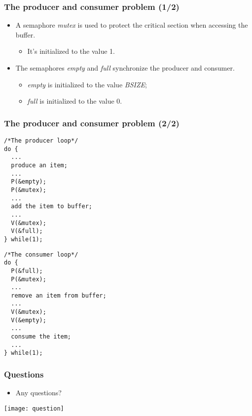\documentclass[CJKutf8,dvipsnames,table]{beamer}
\begin{document}
\begin{CJK*}{UTF8}{song}
  \begin{frame}
  \frametitle{The producer and consumer problem (1/2)} \pause
  \begin{itemize}
  \item{A semaphore \emph{mutex} is used to protect the critical section when accessing the buffer.} \pause
    \begin{itemize}
    \item{It's initialized to the value 1.} \pause
    \end{itemize}
  \item{The semaphores \emph{empty} and \emph{full} synchronize the producer
    and consumer.} \pause
    \begin{itemize}
    \item{\emph{empty} is initialized to the value \emph{BSIZE};} \pause
    \item{\emph{full} is initialized to the value 0.}
    \end{itemize}
  \end{itemize}
  \end{frame}

  \begin{frame}[fragile]
  \frametitle{The producer and consumer problem (2/2)} \pause
  \begin{minipage}[c]{0.5\textwidth}

\begin{lstlisting}
/*The producer loop*/
do {
  ...
  produce an item;
  ...
  P(&empty);
  P(&mutex);
  ...
  add the item to buffer;
  ...
  V(&mutex);
  V(&full);
} while(1);
\end{lstlisting}

  \end{minipage}%
  \pause
  \begin{minipage}[c]{0.5\textwidth}

\begin{lstlisting}
/*The consumer loop*/
do {
  P(&full);
  P(&mutex);
  ...
  remove an item from buffer;
  ...
  V(&mutex);
  V(&empty);
  ...
  consume the item;
  ...
} while(1);
\end{lstlisting}

  \end{minipage}

\end{frame}

  \begin{frame}
  \frametitle{Questions}
  \begin{itemize}
  \item{Any questions?}
  \end{itemize}
  \begin{center}
    \texttt{[image: question]}
  \end{center}
  \end{frame}


\end{CJK*}
\end{document}
